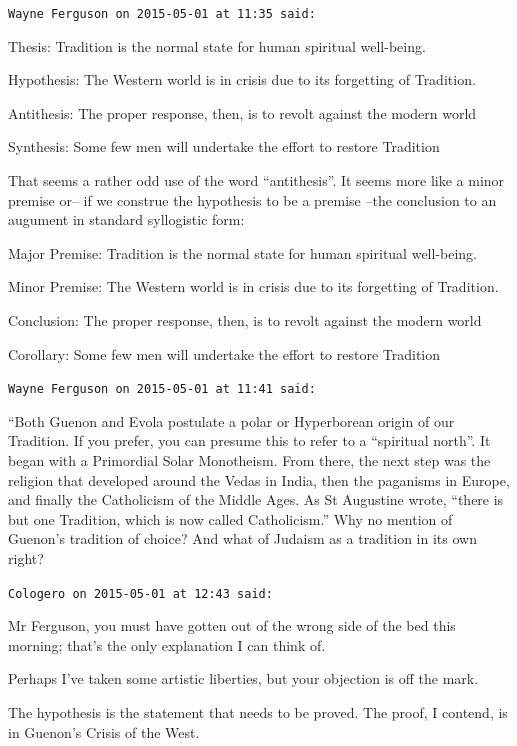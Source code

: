\begin{footnotesize}
\begin{sffamily}
\hfill

\texttt{Wayne Ferguson on 2015-05-01 at 11:35 said:}

Thesis: Tradition is the normal state for human spiritual well-being.

Hypothesis: The Western world is in crisis due to its forgetting of Tradition.

Antithesis: The proper response, then, is to revolt against the modern world

Synthesis: Some few men will undertake the effort to restore Tradition

That seems a rather odd use of the word ``antithesis''. It seems more like a minor premise or-- if we construe the hypothesis to be a premise --the conclusion to an augument in standard syllogistic form:

Major Premise: Tradition is the normal state for human spiritual well-being.

Minor Premise: The Western world is in crisis due to its forgetting of Tradition.

Conclusion: The proper response, then, is to revolt against the modern world

Corollary: Some few men will undertake the effort to restore Tradition

\hfill

\texttt{Wayne Ferguson on 2015-05-01 at 11:41 said:} 

``Both Guenon and Evola postulate a polar or Hyperborean origin of our Tradition. If you prefer, you can presume this to refer to a ``spiritual north''. It began with a Primordial Solar Monotheism. From there, the next step was the religion that developed around the Vedas in India, then the paganisms in Europe, and finally the Catholicism of the Middle Ages. As St Augustine wrote, ``there is but one Tradition, which is now called Catholicism.'' Why no mention of Guenon's tradition of choice? And what of Judaism as a tradition in its own right?

\hfill

\texttt{Cologero on 2015-05-01 at 12:43 said:}

Mr Ferguson, you must have gotten out of the wrong side of the bed this morning; that's the only explanation I can think of.

Perhaps I've taken some artistic liberties, but your objection is off the mark.

The hypothesis is the statement that needs to be proved. The proof, I contend, is in Guenon's Crisis of the West.


\end{sffamily}
\end{footnotesize}
